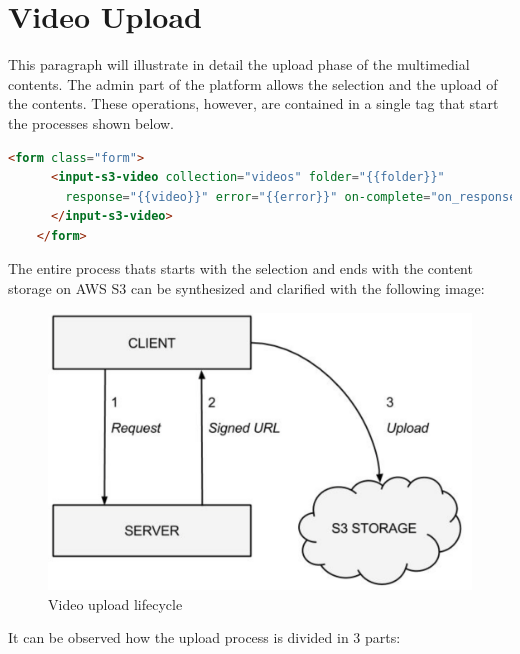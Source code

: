 \section{Video Upload}
\label{sec:video_upload}

This paragraph will illustrate in detail the upload phase of the multimedial contents.
The admin part of the platform allows the selection and the upload of the contents. These operations, however, are contained in a single tag that start the processes shown below.

\begin{lstlisting}[language=html]
   <form class="form">
      <input-s3-video collection="videos" folder="{{folder}}"
        response="{{video}}" error="{{error}}" on-complete="on_response">
      </input-s3-video>
    </form>
\end{lstlisting}

The entire process thats starts with the selection and ends with the content storage on AWS S3 can be synthesized and clarified with the following image:

\begin{figure}[htb]
 \centering
 \includegraphics[width=1.0\linewidth]{images/chapter6/upload.png}\hfill
 \caption[Video upload lifecycle]{Video upload lifecycle}
 \label{fig:fourV}
\end{figure}

It can be observed how the upload process is divided in 3 parts:


